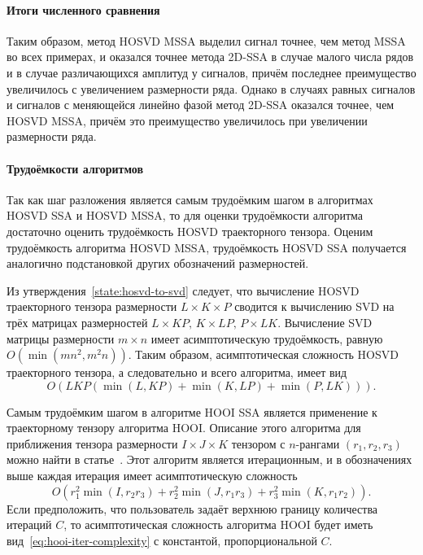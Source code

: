 \documentclass[specialist,
    substylefile = spbu_report.rtx,
    subf,href,colorlinks=true, 12pt]{disser}
\theoremstyle{plain}
\theoremstyle{definition}
\theoremstyle{remark}
\begin{document}
    \paragraph{Итоги численного сравнения}\label{par:numerical-comparison-res}
    Таким образом, метод HOSVD MSSA выделил сигнал точнее, чем метод MSSA во всех примерах, и
    оказался точнее метода 2D-SSA в случае малого числа рядов и в случае различающихся
    амплитуд у сигналов, причём последнее преимущество увеличилось с увеличением размерности ряда.
    Однако в случаях равных сигналов и сигналов с меняющейся линейно фазой метод 2D-SSA оказался точнее,
    чем HOSVD MSSA, причём это преимущество увеличилось при увеличении размерности ряда.

    \paragraph{Трудоёмкости алгоритмов}\label{par:alg-complexity}
    Так как шаг разложения является самым трудоёмким шагом в алгоритмах HOSVD SSA и HOSVD MSSA,
    то для оценки трудоёмкости алгоритма достаточно оценить трудоёмкость HOSVD траекторного тензора.
    Оценим трудоёмкость алгоритма HOSVD MSSA, трудоёмкость HOSVD SSA получается аналогично подстановкой
    других обозначений размерностей.

    Из утверждения~\ref{state:hosvd-to-svd} следует, что вычисление HOSVD траекторного тензора размерности ${L\times K \times P}$
    сводится к вычислению SVD на трёх матрицах размерностей $L\times KP,\, K\times LP,\, P\times LK$.
    Вычисление SVD матрицы размерности $m\times n$ имеет асимптотическую трудоёмкость, равную $O(\min(mn^2, m^2 n)).$
    Таким образом, асимптотическая сложность HOSVD траекторного тензора, а следовательно и всего алгоритма, имеет вид
    \begin{equation}
        \label{eq:hosvd-mssa-complexity}
        O\left(LKP(\min(L, KP) + \min(K, LP) + \min(P, LK))\right).
    \end{equation}

    Самым трудоёмким шагом в алгоритме HOOI SSA является применение к траекторному тензору алгоритма HOOI.
    Описание этого алгоритма для приближения тензора размерности $I\times J \times K$
    тензором с $n$-рангами $(r_1, r_2, r_3)$ можно найти в статье~\cite{hooi-algorithm}.
    Этот алгоритм является итерационным, и в обозначениях выше каждая итерация имеет асимптотическую сложность
    \begin{equation}
        \label{eq:hooi-iter-complexity}
        O(r_1^2 \min(I, r_2 r_3) + r_2^2 \min(J, r_1 r_3) + r_3^2 \min(K, r_1 r_2)).
    \end{equation}
    Если предположить, что пользователь задаёт верхнюю границу количества итераций $C$, то асимптотическая
    сложность алгоритма HOOI будет иметь вид~\eqref{eq:hooi-iter-complexity} с константой,
    пропорциональной $C$.
\end{document}
